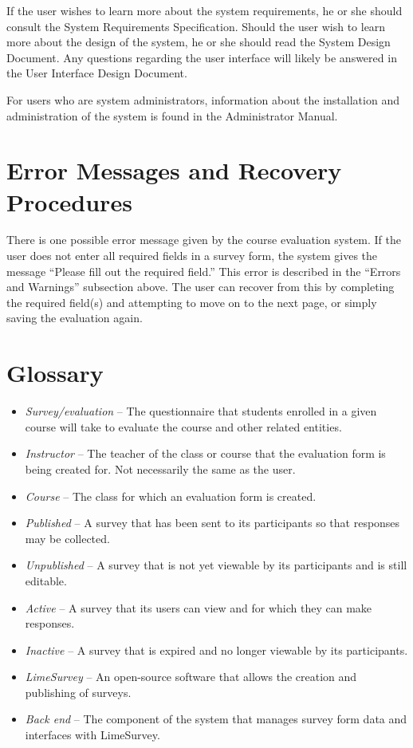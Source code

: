\documentclass{article}
\begin{document}
If the user wishes to learn more about the system requirements, he or she should consult the System Requirements Specification. Should the user wish to learn more about the design of the system, he or she should read the System Design Document. Any questions regarding the user interface will likely be answered in the User Interface Design Document. 

For users who are system administrators, information about the installation and administration of the system is found in the Administrator Manual. 

\appendix

\newpage

\section{Error Messages and Recovery Procedures}

There is one possible error message given by the course evaluation system. If the user does not enter all required fields in a survey form, the system gives the message ``Please fill out the required field.'' This error is described in the ``Errors and Warnings'' subsection above. The user can recover from this by completing the required field(s) and attempting to move on to the next page, or simply saving the evaluation again.

\section{Glossary}

\begin{itemize}
 \item \textit{Survey/evaluation} -- The questionnaire that students enrolled in a given course will take to evaluate the course and other related entities.
 \item \textit{Instructor} -- The teacher of the class or course that the evaluation form is being created for. Not necessarily the same as the user.
 \item \textit{Course} -- The class for which an evaluation form is created.
 \item \textit{Published} -- A survey that has been sent to its participants so that responses may be collected.
 \item \textit{Unpublished} -- A survey that is not yet viewable by its participants and is still editable.
 \item \textit{Active} -- A survey that its users can view and for which they can make responses.
 \item \textit{Inactive} -- A survey that is expired and no longer viewable by its participants.
 \item \textit{LimeSurvey} -- An open-source software that allows the creation and publishing of surveys.
 \item \textit{Back end} -- The component of the system that manages survey form data and interfaces with LimeSurvey.
\end{itemize}
\end{document}
